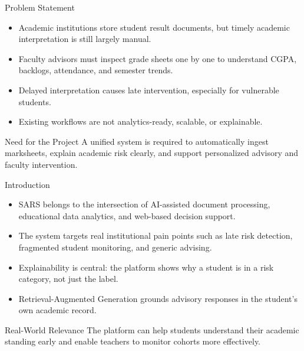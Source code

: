 \documentclass[aspectratio=169]{beamer}
\begin{document}
\begin{frame}{Problem Statement}
  \begin{itemize}
    \item Academic institutions store student result documents, but timely academic interpretation is still largely manual.
    \item Faculty advisors must inspect grade sheets one by one to understand CGPA, backlogs, attendance, and semester trends.
    \item Delayed interpretation causes late intervention, especially for vulnerable students.
    \item Existing workflows are not analytics-ready, scalable, or explainable.
  \end{itemize}
  \vspace{0.3cm}
  \begin{alertblock}{Need for the Project}
    A unified system is required to automatically ingest marksheets, explain academic risk clearly, and support personalized advisory and faculty intervention.
  \end{alertblock}
\end{frame}

\begin{frame}{Introduction}
  \begin{itemize}
    \item SARS belongs to the intersection of AI-assisted document processing, educational data analytics, and web-based decision support.
    \item The system targets real institutional pain points such as late risk detection, fragmented student monitoring, and generic advising.
    \item Explainability is central: the platform shows why a student is in a risk category, not just the label.
    \item Retrieval-Augmented Generation grounds advisory responses in the student's own academic record.
  \end{itemize}
  \vspace{0.2cm}
  \begin{block}{Real-World Relevance}
    The platform can help students understand their academic standing early and enable teachers to monitor cohorts more effectively.
  \end{block}
\end{frame}
\end{document}
